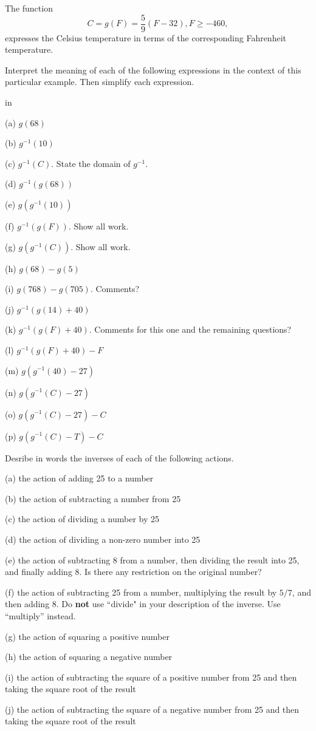 \documentclass{ximera}
\newcommand{\pskip}{\vskip 0.1 in}
\begin{document}
\begin{example} \label{Ex1:Inverses}
The function
\[
    C = g(F) = \frac{5}{9}\left( F - 32  \right) , F\geq -460 ,
\]
expresses the Celsius temperature in terms of the corresponding Fahrenheit temperature.

Interpret the meaning of each of the following expressions in the context of this particular example. Then simplify each expression.

\pskip

(a) $g(68)$

(b) $g^{-1}(10)$

(c) $g^{-1}(C)$. State the domain of $g^{-1}$.

(d)  $g^{-1}(g(68))$

(e) $g(g^{-1}(10))$

(f) $g^{-1}(g(F))$. Show all work.

(g) $g(g^{-1}(C))$. Show all work.

(h) $g(68) - g(5)$

(i) $g(768) - g(705)$. Comments?

(j) $g^{-1}(g(14)+40)$

(k) $g^{-1}(g(F)+40)$. Comments for this one and the remaining questions?

(l) $g^{-1}(g(F)+40) - F$

(m) $g(g^{-1}(40) - 27)$

(n) $g(g^{-1}(C) - 27)$

(o) $g(g^{-1}(C) - 27) - C$

(p) $g(g^{-1}(C) - T) - C$

\end{example}



\begin{example}  \label{Ex2:Inverse}
Desribe in words the inverses of each of the following actions.

(a) the action of adding 25 to a number

(b) the action of subtracting a number from 25

(c) the action of dividing a number by 25

(d) the action of dividing a non-zero number into 25

(e) the action of subtracting 8 from a number, then dividing the result into 25, and finally adding 8. Is there any restriction on the original number?

(f) the action of subtracting 25 from a number, multiplying the result by $5/7$, and then adding 8. Do {\bf not} use ``divide" in your description of the inverse. Use ``multiply'' instead.

(g) the action of squaring a positive number

(h) the action of squaring a negative number

(i) the action of subtracting the square of a positive number from 25 and then taking the square root of the result

(j) the action of subtracting the square of a negative number from 25 and then taking the square root of the result
\end{example}
\end{document}
